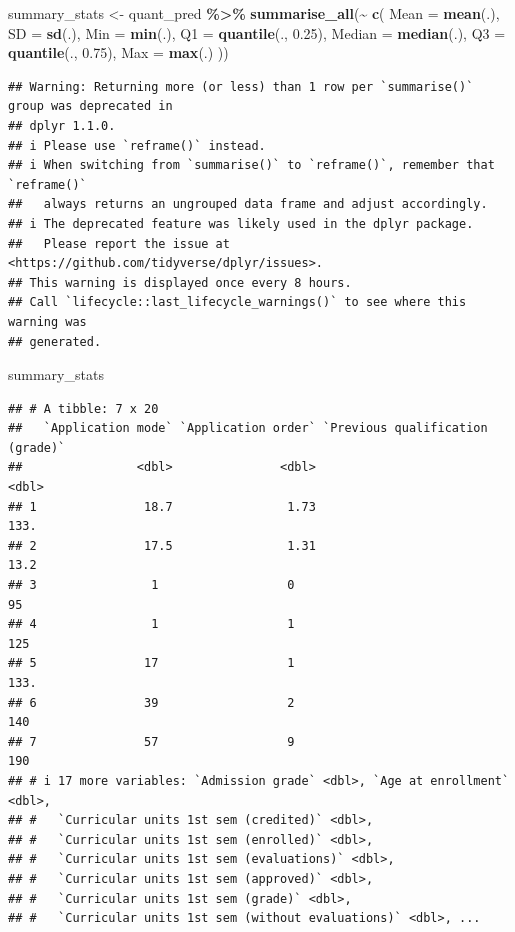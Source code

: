 \documentclass[
]{article}
\newenvironment{Shaded}{\begin{snugshade}}{\end{snugshade}}
\newcommand{\AttributeTok}[1]{\textcolor[rgb]{0.13,0.29,0.53}{#1}}
\newcommand{\FloatTok}[1]{\textcolor[rgb]{0.00,0.00,0.81}{#1}}
\newcommand{\FunctionTok}[1]{\textcolor[rgb]{0.13,0.29,0.53}{\textbf{#1}}}
\newcommand{\NormalTok}[1]{#1}
\newcommand{\OtherTok}[1]{\textcolor[rgb]{0.56,0.35,0.01}{#1}}
\newcommand{\SpecialCharTok}[1]{\textcolor[rgb]{0.81,0.36,0.00}{\textbf{#1}}}
\begin{document}
\begin{Shaded}
\begin{Highlighting}[]
\NormalTok{summary\_stats }\OtherTok{\textless{}{-}}\NormalTok{ quant\_pred }\SpecialCharTok{\%\textgreater{}\%}
  \FunctionTok{summarise\_all}\NormalTok{(}\SpecialCharTok{\textasciitilde{}} \FunctionTok{c}\NormalTok{(}
    \AttributeTok{Mean =} \FunctionTok{mean}\NormalTok{(.),}
    \AttributeTok{SD =} \FunctionTok{sd}\NormalTok{(.),}
    \AttributeTok{Min =} \FunctionTok{min}\NormalTok{(.),}
    \AttributeTok{Q1 =} \FunctionTok{quantile}\NormalTok{(., }\FloatTok{0.25}\NormalTok{),}
    \AttributeTok{Median =} \FunctionTok{median}\NormalTok{(.),}
    \AttributeTok{Q3 =} \FunctionTok{quantile}\NormalTok{(., }\FloatTok{0.75}\NormalTok{),}
    \AttributeTok{Max =} \FunctionTok{max}\NormalTok{(.)}
\NormalTok{  ))}
\end{Highlighting}
\end{Shaded}

\begin{verbatim}
## Warning: Returning more (or less) than 1 row per `summarise()` group was deprecated in
## dplyr 1.1.0.
## i Please use `reframe()` instead.
## i When switching from `summarise()` to `reframe()`, remember that `reframe()`
##   always returns an ungrouped data frame and adjust accordingly.
## i The deprecated feature was likely used in the dplyr package.
##   Please report the issue at <https://github.com/tidyverse/dplyr/issues>.
## This warning is displayed once every 8 hours.
## Call `lifecycle::last_lifecycle_warnings()` to see where this warning was
## generated.
\end{verbatim}

\begin{Shaded}
\begin{Highlighting}[]
\NormalTok{summary\_stats}
\end{Highlighting}
\end{Shaded}

\begin{verbatim}
## # A tibble: 7 x 20
##   `Application mode` `Application order` `Previous qualification (grade)`
##                <dbl>               <dbl>                            <dbl>
## 1               18.7                1.73                            133. 
## 2               17.5                1.31                             13.2
## 3                1                  0                                95  
## 4                1                  1                               125  
## 5               17                  1                               133. 
## 6               39                  2                               140  
## 7               57                  9                               190  
## # i 17 more variables: `Admission grade` <dbl>, `Age at enrollment` <dbl>,
## #   `Curricular units 1st sem (credited)` <dbl>,
## #   `Curricular units 1st sem (enrolled)` <dbl>,
## #   `Curricular units 1st sem (evaluations)` <dbl>,
## #   `Curricular units 1st sem (approved)` <dbl>,
## #   `Curricular units 1st sem (grade)` <dbl>,
## #   `Curricular units 1st sem (without evaluations)` <dbl>, ...
\end{verbatim}
\end{document}

